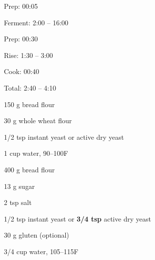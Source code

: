 \documentclass[oneside]{book}  %
\newcommand{\degF}{\textdegree F\xspace}
\begin{document}
\begin{twocols}
  \begin{timeline}
    \item[Prep:]  00:05
    \item[Ferment:]  2:00 -- 16:00
  \end{timeline}
  \begin{timeline}
    \item[Prep:] 00:30
    \item[Rise:] 1:30 -- 3:00
    \item[Cook:] 00:40
    \item[Total:] 2:40 -- 4:10
  \end{timeline}

  \columnbreak

  \begin{ingredients}
    \item[150 g] bread flour
    \item[30 g] whole wheat flour
    \item[1/2 tsp] instant yeast or active dry yeast
    \item[1 cup] water, 90--100\degF
  \end{ingredients}
  \begin{ingredients}
    \item[400 g] bread flour
    \item[13 g] sugar
    \item[2 tsp] salt
    \item[1/2 tsp] instant yeast or \textbf{3/4 tsp} active dry yeast
    \item[30 g] gluten (optional)
    \item[3/4 cup] water, 105--115\degF
  \end{ingredients}
\end{twocols}
\end{document}
